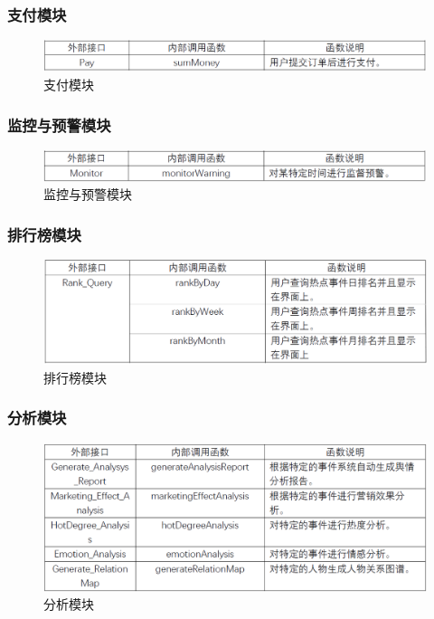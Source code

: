\subsubsection{支付模块}
\begin{figure}[!htbp]
	\centering
	\includegraphics[scale=0.7]{image/m6.png}
	\caption{支付模块}
\end{figure}
\subsubsection{监控与预警模块}
\begin{figure}[!htbp]
	\centering
	\includegraphics[scale=0.7]{image/m7.png}
	\caption{监控与预警模块}
\end{figure}
\subsubsection{排行榜模块}
\begin{figure}[!htbp]
	\centering
	\includegraphics[scale=0.55]{image/m8.png}
	\caption{排行榜模块}
\end{figure}
\subsubsection{分析模块}
\begin{figure}[!htbp]
	\centering
	\includegraphics[scale=0.7]{image/m9.png}
	\caption{分析模块}
\end{figure}
